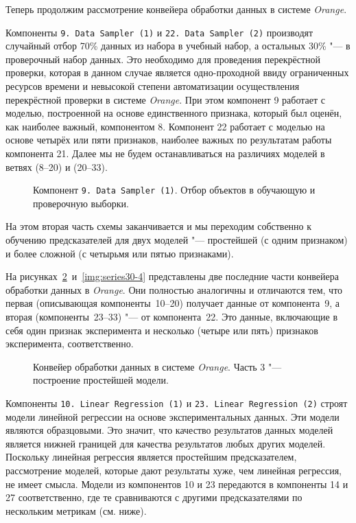 Теперь продолжим рассмотрение конвейера обработки данных в системе \textit{Orange}.

Компоненты \texttt{9.\,Data~Sampler~(1)} и \texttt{22.\,Data~Sampler~(2)} производят случайный отбор 70\% данных из набора в учебный набор, а остальных 30\% "--- в проверочный набор данных. Это необходимо для проведения перекрёстной проверки, которая в данном случае является одно-проходной ввиду ограниченных ресурсов времени и невысокой степени автоматизации осуществления перекрёстной проверки в системе \textit{Orange}. При этом компонент 9 работает с моделью, построенной на основе единственного признака, который был оценён, как наиболее важный, компонентом 8. Компонент 22 работает с моделью на основе четырёх или пяти признаков, наиболее важных по результатам работы компонента 21. Далее мы не будем останавливаться на различиях моделей в ветвях (8--20) и (20--33).

\begin{figure}[tbp]
    \caption{Компонент \texttt{9.\,Data~Sampler~(1)}. Отбор объектов в обучающую и проверочную выборки.}
    \label{img:9-Data-Sampler-1}
\end{figure}

На этом вторая часть схемы заканчивается и мы переходим собственно к обучению предсказателей для двух моделей "--- простейшей (с одним признаком) и более сложной (с четырьмя или пятью признаками).

На рисунках~\ref{img:series30-3}~и~\ref{img:series30-4} представлены две последние части конвейера обработки данных в \textit{Orange}. Они полностью аналогичны и отличаются тем, что первая (описывающая компоненты~10--20) получает данные от компонента~9, а вторая (компоненты~23--33) "--- от компонента~22. Это данные, включающие в себя один признак эксперимента и несколько (четыре или пять) признаков эксперимента, соответственно.

\begin{figure}[tbp]
    \caption{Конвейер обработки данных в системе \textit{Orange}. Часть 3 "--- построение простейшей модели.}
    \label{img:series30-3}
\end{figure}

Компоненты \texttt{10.\,Linear~Regression~(1)} и \texttt{23.\,Linear~Regression~(2)} строят модели линейной регрессии на основе экспериментальных данных. Эти модели являются образцовыми. Это значит, что качество результатов данных моделей является нижней границей для качества результатов любых других моделей. Поскольку линейная регрессия является простейшим предсказателем, рассмотрение моделей, которые дают результаты хуже, чем линейная регрессия, не имеет смысла. Модели из компонентов 10 и 23 передаются в компоненты 14 и 27 соответственно, где те сравниваются с другими предсказателями по нескольким метрикам (см. ниже).

